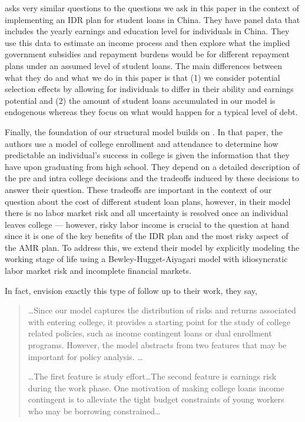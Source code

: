   \cite{CaiChapmanWang2018} asks very similar questions to the questions we ask in this paper in the
  context of implementing an IDR plan for student loans in China. They have panel data that includes
  the yearly earnings and education level for individuals in China. They use this data to estimate
  an income process and then explore what the implied government subsidies and repayment burdens
  would be for different repayment plans under an assumed level of student loans. The main
  differences between what they do and what we do in this paper is that (1) we consider potential
  selection effects by allowing for individuals to differ in their ability and earnings potential
  and (2) the amount of student loans accumulated in our model is endogenous whereas they focus on
  what would happen for a typical level of debt.

  Finally, the foundation of our structural model builds on \cite{HendricksLeukhina2017}. In that
  paper, the authors use a model of college enrollment and attendance to determine how predictable
  an individual's success in college is given the information that they have upon graduating from
  high school. They depend on a detailed description of the pre and intra college decisions and the
  tradeoffs induced by these decisions to answer their question. These tradeoffs are important in
  the context of our question about the cost of different student loan plans, however, in their
  model there is no labor market risk and all uncertainty is resolved once an individual leaves
  college --- however, risky labor income is crucial to the question at hand since it is one of the
  key benefits of the IDR plan and the most risky aspect of the AMR plan. To address this, we extend
  their model by explicitly modeling the working stage of life using a Bewley-Hugget-Aiyagari model
  with idiosyncratic labor market risk and incomplete financial markets.

  In fact, \cite{HendricksLeukhina2017} envision exactly this type of follow up to their work, they
  say,

  \begin{quote}
    \dots Since our model captures the distribution of risks and returns associated with entering
    college, it provides a starting point for the study of college related policies, such as income
    contingent loans or dual enrollment programs. However, the model abstracts from two features
    that may be important for policy analysis. \dots

    \dots The first feature is study effort\dots The second feature is earnings risk during the work
    phase. One motivation of making college loans income contingent is to alleviate the tight budget
    constraints of young workers who may be borrowing constrained\dots
  \end{quote}

